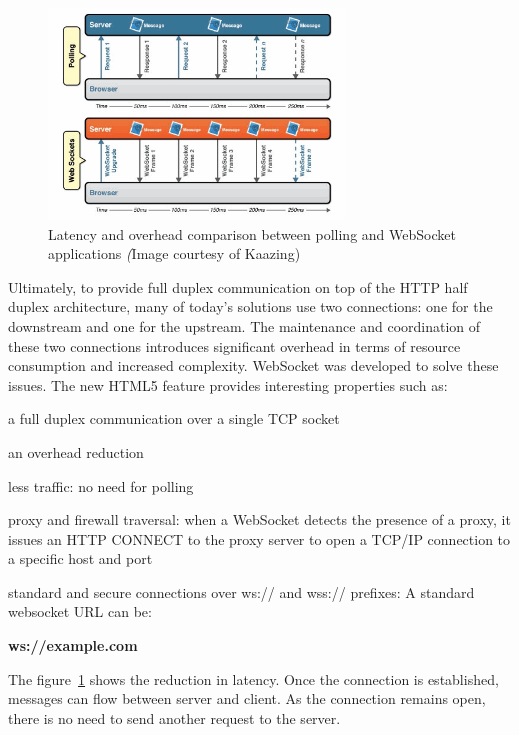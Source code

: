 \documentclass[pdftex,10pt,a4paper]{report}
\newenvironment{packed_item}{
\begin{itemize}
  \setlength{\itemsep}{1pt}
  \setlength{\parskip}{0pt}
  \setlength{\parsep}{0pt}
}{\end{itemize}}
\begin{document}
\begin{figure}[h!]
		\centering
		\includegraphics[width=0.7\textwidth]{./ws_poll.jpg}
		\caption{Latency and overhead comparison between polling and WebSocket applications \textit(Image courtesy of Kaazing)}
		\label{Latency and overhead comparison between polling and WebSocket applications}
\end{figure}

Ultimately, to provide full duplex communication on top of the HTTP half duplex architecture, many of today's solutions use two connections: one for the downstream and one for the upstream. The maintenance and coordination of these two connections introduces significant overhead in terms of resource consumption and increased complexity. WebSocket was developed to solve these issues. The new HTML5 feature provides interesting properties such as:
\begin{packed_item}
	\item a full duplex communication over a single TCP socket
	\item an overhead reduction
	\item less traffic: no need for polling
	\item proxy and firewall traversal: when a WebSocket detects the presence of a proxy, it issues an HTTP CONNECT to the proxy server to open a TCP/IP connection to a specific host and port
	\item standard and secure connections over ws:// and wss:// prefixes: A standard websocket URL can be: 
	\begin{center}
		\textbf{ws://example.com}
	\end{center}
\end{packed_item}

The figure~\ref{Latency and overhead comparison between polling and WebSocket applications} shows the reduction in latency. Once the connection is established, messages can flow between server and client. As the connection remains open, there is no need to send another request to the server.
\end{document}
